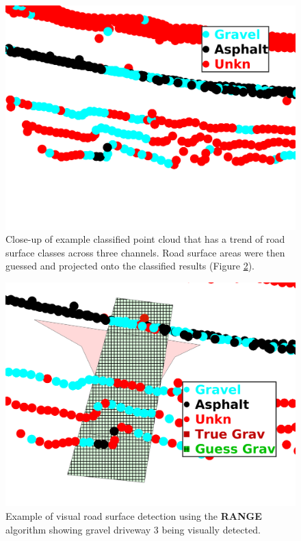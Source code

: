 \documentclass[numbered,pdftex]{ohio-etd}
\begin{document}
{{		\begin{figure}[H]
			\centering
			\includegraphics[width=0.95\linewidth]{Defense_Images/pre_guess}
			\caption[Visual Scores: RANGE Source]{Close-up of example classified point cloud that has a trend of road surface classes across three channels. Road surface areas were then guessed and projected onto the classified results (Figure \ref{fig:range_example_vis_score}).}
			\label{fig:pre_guess}
		\end{figure}
		
		\begin{figure}[H]
			\centering
			\includegraphics[width=0.95\linewidth]{Defense_Images/range_db_6_overlap_2}
			\caption[Visual Scores: RANGE]{Example of visual road surface detection using the \textbf{RANGE} algorithm showing gravel driveway $3$ being visually detected.}
			\label{fig:range_example_vis_score}
		\end{figure}
		
}}
\end{document}
